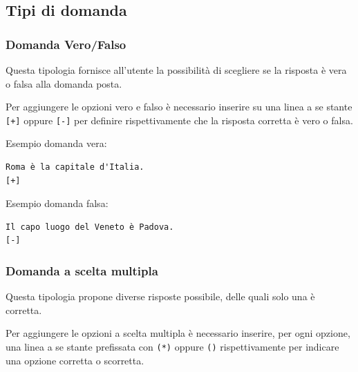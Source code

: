 \documentclass[12pt,a4paper]{article}
\begin{document}
	\subsection{Tipi di domanda}


	\subsubsection{Domanda Vero/Falso}

	\par Questa tipologia fornisce all'utente la possibilità di scegliere se la risposta è vera o falsa alla domanda posta. \\
	\par Per aggiungere le opzioni vero e falso è necessario inserire su una linea a se stante \texttt{[+]} oppure \texttt{[-]} per definire rispettivamente che la risposta corretta è vero o falsa. \\

	\par Esempio domanda vera: \\
\begin{verbatim}
Roma è la capitale d'Italia.
[+]
\end{verbatim}

	\par Esempio domanda falsa: \\
\begin{verbatim}
Il capo luogo del Veneto è Padova.
[-]
\end{verbatim}
	
\subsubsection{Domanda a scelta multipla}

\par Questa tipologia propone diverse risposte possibile, delle quali solo una è corretta. \\

\par Per aggiungere le opzioni a scelta multipla è necessario inserire, per ogni opzione, una linea a se stante prefissata con \texttt{(*)} oppure \texttt{()} rispettivamente per indicare una opzione corretta o scorretta. \\
\end{document}
